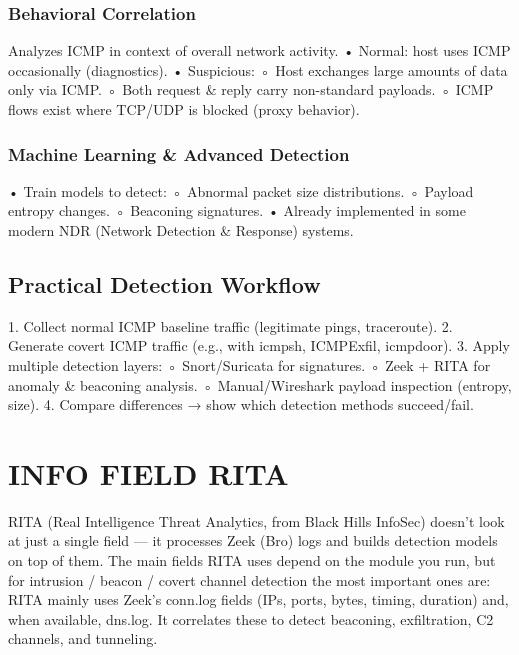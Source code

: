 \subsubsection{Behavioral Correlation}
Analyzes ICMP in context of overall network activity.
    • Normal: host uses ICMP occasionally (diagnostics).
    • Suspicious:
        ◦ Host exchanges large amounts of data only via ICMP.
        ◦ Both request \& reply carry non-standard payloads.
        ◦ ICMP flows exist where TCP/UDP is blocked (proxy behavior).

\subsubsection{Machine Learning \& Advanced Detection}
    • Train models to detect:
        ◦ Abnormal packet size distributions.
        ◦ Payload entropy changes.
        ◦ Beaconing signatures.
    • Already implemented in some modern NDR (Network Detection \& Response) systems.

\subsection{Practical Detection Workflow}
    1. Collect normal ICMP baseline traffic (legitimate pings, traceroute).
    2. Generate covert ICMP traffic (e.g., with icmpsh, ICMPExfil, icmpdoor).
    3. Apply multiple detection layers:
        ◦ Snort/Suricata for signatures.
        ◦ Zeek + RITA for anomaly \& beaconing analysis.
        ◦ Manual/Wireshark payload inspection (entropy, size).
    4. Compare differences → show which detection methods succeed/fail.



\section{INFO FIELD RITA} 
RITA (Real Intelligence Threat Analytics, from Black Hills InfoSec) doesn’t look at just a single field — it processes Zeek (Bro) logs and builds detection models on top of them.
The main fields RITA uses depend on the module you run, but for intrusion / beacon / covert channel detection the most important ones are: 
%
RITA mainly uses Zeek’s conn.log fields (IPs, ports, bytes, timing, duration) and, when available, dns.log. It correlates these to detect beaconing, exfiltration, C2 channels, and tunneling.

